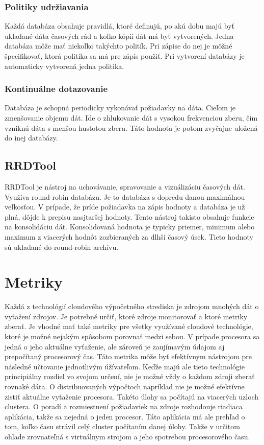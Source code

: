 \documentclass[11pt,final,oneside]{fithesis}
\begin{document}
\subsection{Politiky udržiavania}
Každá databáza obsahuje pravidlá, ktoré definujú, po akú dobu majú byť ukladané dáta časových rád a koľko kópií dát má byť vytvorených. Jedna databáza môže mať niekoľko takýchto politík. Pri zápise 
do nej je môžné špecifikovať, ktorá politika sa má pre zápis použiť. Pri vytvorení databázy je automaticky vytvorená jedna politika.

\subsection{Kontinuálne dotazovanie}
Databáza je schopná periodicky vykonávať požiadavky na dáta. Cieľom je zmenšovanie objemu dát. Ide o zhlukovanie dát s vysokou frekvenciou zberu, čím vzniknú dáta s menšou hustotou zberu. Táto hodnota je 
potom zvyčajne uložená do inej databázy.

\section{RRDTool}
RRDTool je nástroj na uchovávanie, spravovanie a vizuálizáciu časových dát. Využíva round-robin databázu. Je to databáza s dopredu danou maximálnou veľkosťou. V prípade, že príde požiadavka na zápis hodnoty 
a databáza je už plná, dôjde k prepisu nasjtaršej hodnoty. Tento nástroj takisto obsahuje funkcie na konsolidáciu dát. Konsolidovaná hodnota je typicky priemer, minimum alebo maximum z viacerých hodnôt zozbieraných 
za dlhší časový úsek. Tieto hodnoty sú ukladané do round-robin archívu.



\chapter{Metriky}
Každá z technológií cloudového výpočetného strediska je zdrojom mnohých dát o vyťažení zdrojov. Je potrebné určiť, ktoré zdroje monitorovať a ktoré metriky zberať. Je vhodné mať také metriky pre všetky využívané cloudové technológie,
ktoré je možné nejakým spôsobom porovnať medzi sebou. V prípade procesora sa jedná o jeho aktuálne vyťaženie, ale zároveň je zaujímavým údajom aj prepočítaný procesorový čas. Táto metrika môže byť efektívnym
nástrojom pre následné učtovanie jednotlivým úžívateľom. Keďže majú ale tieto technológie principiálny rozdiel vo svojom určení, nie je možné vždy o každom zdroji zberať rovnaké dáta. 
O distribuovaných výpočtoch napríklad nie je možné efektívne zistiť aktuálne vyťaženie procesora. Takéto úlohy sa počítajú na viacerých uzloch clustera. O poradí a rozmiestnení požiadaviek na zdroje
rozhodouje riadiaca aplikácia, takže sa nejedná o jeden procesor. Táto aplikácia má ale prehľad o tom, koľko času strávil celý cluster počítaním danej úlohy. Takže v určitom ohľade zrovnateľná s virtuálnym
strojom a jeho spotrebou procesorového času.
\end{document}

